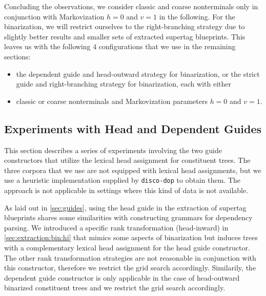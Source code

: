 \documentclass[../../document.tex]{subfiles}
\begin{document}
    Concluding the observations, we consider classic and coarse nonterminals only in conjunction with Markovization \(h=0\) and \(v=1\) in the following.
    For the binarization, we will restrict ourselves to the right-branching strategy due to slightly better results and smaller sets of extracted supertag blueprints.
    This leaves us with the following \(4\) configurations that we use in the remaining sections:
    \begin{itemize}
        \item the dependent guide and head-outward strategy for binarization, or the strict guide and right-branching strategy for binarization, each with either
        \item classic or coarse nonterminals and Markovization parameters \(h=0\) and \(v=1\).
    \end{itemize}

    \subsection{Experiments with Head and Dependent Guides}\label{sec:gridsearch:head}
    This section describes a series of experiments involving the two guide constructors that utilize the lexical head assignment for constituent trees.
    The three corpora that we use are not equipped with lexical head assignments, but we use a heuristic implementation supplied by \texttt{disco-dop} to obtain them.
    The approach is not applicable in settings where this kind of data is not available.

    As laid out in \cref{sec:guides}, using the head guide in the extraction of supertag blueprints shares some similarities with constructing grammars for dependency parsing.
    We introduced a specific rank transformation (head-inward) in \cref{sec:extraction:bin:hi} that mimics some aspects of binarization but induces trees with a complementary lexical head assignment for the head guide constructor.
    The other rank transformation strategies are not reasonable in conjunction with this constructor, therefore we restrict the grid search accordingly.
    Similarily, the dependent guide constructor is only applicable in the case of head-outward binarized constituent trees and we restrict the grid search accordingly.
\end{document}
